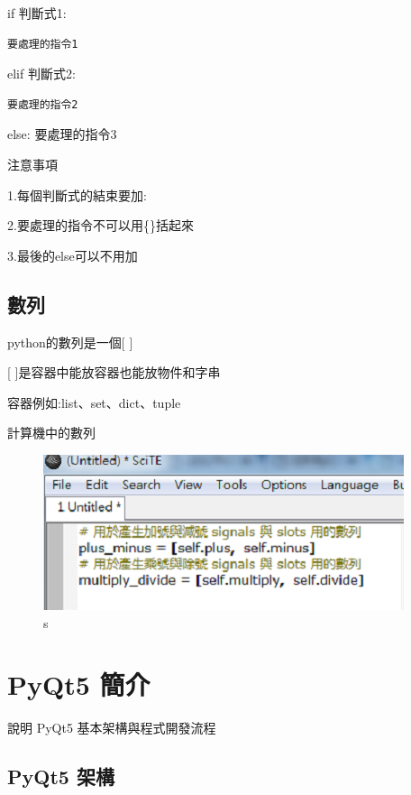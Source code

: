 \documentclass[12pt,,]{report}
\begin{document}
if 判斷式1:

\begin{verbatim}
要處理的指令1
\end{verbatim}

elif 判斷式2:

\begin{verbatim}
要處理的指令2
\end{verbatim}

else: 要處理的指令3

注意事項

1.每個判斷式的結束要加:

2.要處理的指令不可以用\{\}括起來

3.最後的else可以不用加

\hypertarget{ux6578ux5217}{%
\section{數列}\label{ux6578ux5217}}

python的數列是一個{[} {]}

{[} {]}是容器中能放容器也能放物件和字串

容器例如:list、set、dict、tuple

計算機中的數列

\begin{figure}
\centering
\includegraphics{./tex2pdf.2656/f4203eb0a9255f7eac1ae2abb9edd89f72c6dfcc.png}
\caption{s\label{fig:數列}}
\end{figure}

\hypertarget{pyqt5-ux7c21ux4ecb}{%
\chapter{PyQt5 簡介}\label{pyqt5-ux7c21ux4ecb}}

說明 PyQt5 基本架構與程式開發流程

\hypertarget{pyqt5-ux67b6ux69cb}{%
\section{PyQt5 架構}\label{pyqt5-ux67b6ux69cb}}
\end{document}
